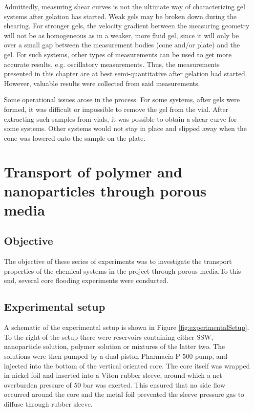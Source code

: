 Admittedly, measuring shear curves is not the ultimate way of characterizing gel systems after gelation has started. Weak gels may be broken down during the shearing. For stronger gels, the velocity gradient between the measuring geometry will not be as homogeneous as in a weaker, more fluid gel, since it will only be over a small gap between the measurement bodies (cone and/or plate) and the gel. For such systems, other types of measurements can be used to get more accurate results, e.g. oscillatory measurements. Thus, the measurements presented in this chapter are at best semi-quantitative after gelation had started. However, valuable results were collected from said measurements.

Some operational issues arose in the process. For some systems, after gels were formed, it was difficult or impossible to remove the gel from the vial. After extracting such samples from vials, it was possible to obtain a shear curve for some systems. Other systems would not stay in place and slipped away when the cone was lowered onto the sample on the plate.

\section{Transport of polymer and nanoparticles through porous media}
\subsection{Objective}
The  objective of these series of experiments was to investigate the transport properties of the chemical systems in the project through porous media.To this end, several core flooding experiments were conducted.

\subsection{Experimental setup}
A schematic of the experimental setup  is shown in Figure \ref{fig:experimentalSetup}. To the right of the setup there were reservoirs containing either SSW, nanoparticle solution, polymer solution or mixtures of the latter two. The solutions were then pumped by a dual piston Pharmacia P-500 pump, and injected into the bottom of the vertical oriented core. The core itself was wrapped in nickel foil and inserted into a Viton rubber sleeve, around which a net overburden pressure of 50 bar was exerted. This ensured that no side flow occurred around the core and the metal foil prevented the sleeve pressure gas to diffuse through rubber sleeve.

